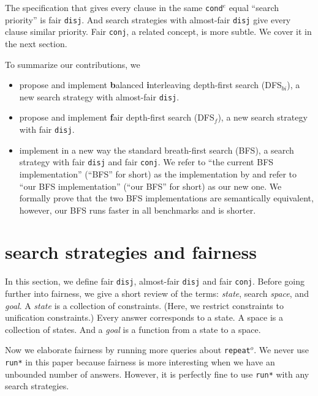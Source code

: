 \documentclass[format=acmlarge, review=true, authordraft=true]{acmart}
\newcommand{\conde}{\texttt{cond$^e$}}
\newcommand{\conj}{\texttt{conj}}
\newcommand{\disj}{\texttt{disj}}
\newcommand{\repeato}{\texttt{repeat$^o$}}
\newcommand{\DFSf }[0]{DFS$_{f}$}
\newcommand{\DFSbi}[0]{DFS$_{bi}$}
\newcommand{\BFS}[0]{BFS}
\begin{document}
The specification that gives every clause in the same \conde{} equal 
``search priority'' is fair \disj{}. And search strategies with 
almost-fair \disj{} give every clause similar priority. 
Fair \conj{}, a related concept, is more subtle. We cover it in the next 
section.

To summarize our contributions, we
\begin{itemize}
	\item propose and implement \textbf{b}alanced \textbf{i}nterleaving 
depth-first search (\DFSbi{}), a new search strategy with almost-fair \disj{}.
	\item propose and implement \textbf{f}air depth-first search (\DFSf{}), 
a new search strategy with fair \disj{}.
	\item implement in a new way the standard breath-first search (\BFS), a 
search strategy with fair \disj{} and fair \conj{}. We refer to ``the current 
BFS implementation'' (``BFS'' for short) as the implementation by 
\citet{seres1999algebra} and refer to ``our BFS implementation'' (``our BFS'' 
for short) as our new one. We formally prove that the two BFS implementations 
are semantically equivalent, however, our BFS runs faster in all benchmarks and 
is shorter.
\end{itemize}

\section{search strategies and fairness}

In this section, we define fair \disj{}, almost-fair \disj{} and fair \conj{}. 
Before going further into fairness, we give a short review of the terms:
\emph{state}, search \emph{space}, and \emph{goal}.
A \emph{state} is a collection of constraints. (Here, we restrict 
constraints to unification constraints.) Every answer corresponds to a 
state. A space is a collection of states. And a \emph{goal} is a 
function from a state to a space.


Now we elaborate fairness by running more queries about \repeato{}. We never 
use \texttt{run*} in this paper because fairness is more interesting when we 
have an unbounded number of answers. However, it is perfectly fine to use 
\texttt{run*} with any search strategies.
\end{document}
